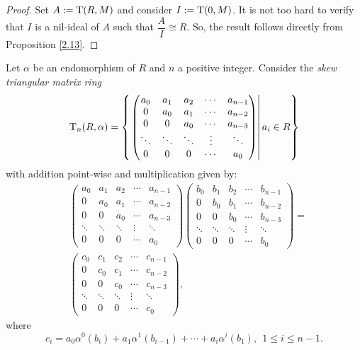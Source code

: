\documentclass[12pt]{amsart}
\theoremstyle{definition}
\begin{document}
\begin{proof}
Set $A:={\rm T}(R, M)$ and consider $I:={\rm T}(0, M)$. It is not too hard to verify that $I$ is a nil-ideal of $A$ such that $\dfrac{A}{I} \cong R$. So, the result follows directly from Proposition \ref{2.13}.
\end{proof}

Let $\alpha$ be an endomorphism of $R$ and $n$ a positive integer. Consider the {\it skew triangular matrix ring}
$${\rm T}_{n}(R,\alpha )=\left\{ \left. \begin{pmatrix}
	a_{0} & a_{1} & a_{2} & \cdots & a_{n-1} \\
	0 & a_{0} & a_{1} & \cdots & a_{n-2} \\
	0 & 0 & a_{0} & \cdots & a_{n-3} \\
	\ddots & \ddots & \ddots & \vdots & \ddots \\
	0 & 0 & 0 & \cdots & a_{0}
\end{pmatrix} \right| a_{i}\in R \right\}$$
with addition point-wise and multiplication given by:
\begin{align*}
&\begin{pmatrix}
		a_{0} & a_{1} & a_{2} & \cdots & a_{n-1} \\
		0 & a_{0} & a_{1} & \cdots & a_{n-2} \\
		0 & 0 & a_{0} & \cdots & a_{n-3} \\
		\ddots & \ddots & \ddots & \vdots & \ddots \\
		0 & 0 & 0 & \cdots & a_{0}
	\end{pmatrix}\begin{pmatrix}
		b_{0} & b_{1} & b_{2} & \cdots & b_{n-1} \\
		0 & b_{0} & b_{1} & \cdots & b_{n-2} \\
		0 & 0 & b_{0} & \cdots & b_{n-3} \\
		\ddots & \ddots & \ddots & \vdots & \ddots \\
		0 & 0 & 0 & \cdots & b_{0}
	\end{pmatrix}  =\\
	& \begin{pmatrix}
		c_{0} & c_{1} & c_{2} & \cdots & c_{n-1} \\
		0 & c_{0} & c_{1} & \cdots & c_{n-2} \\
		0 & 0 & c_{0} & \cdots & c_{n-3} \\
		\ddots & \ddots & \ddots & \vdots & \ddots \\
		0 & 0 & 0 & \cdots & c_{0}
\end{pmatrix},
\end{align*}
where $$c_{i}=a_{0}\alpha^{0}(b_{i})+a_{1}\alpha^{1}(b_{i-1})+\cdots +a_{i}\alpha^{i}(b_{1}),~~ 1\leq i\leq n-1
.$$
\end{document}

